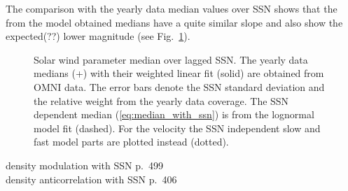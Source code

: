 The comparison with the yearly data median values over SSN shows that the from the model obtained medians have a quite similar slope and also show the expected(??) lower magnitude (see Fig.~\ref{fig:OMNI_yearly_BVNTvsSSN}).\\
\begin{figure}
	\caption{Solar wind parameter median over lagged SSN. The yearly data medians (+) with their weighted linear fit (solid) are obtained from OMNI data. The error bars denote the SSN standard deviation and the relative weight from the yearly data coverage. The SSN dependent median (\ref{eq:median_with_ssn}) is from the lognormal model fit (dashed). For the velocity the SSN independent slow and fast model parts are plotted instead (dotted).}
	\label{fig:OMNI_yearly_BVNTvsSSN}
\end{figure}

density modulation with SSN \citep{Schwenn1983} p.~499\\
density anticorrelation with SSN \citep{Bougeret1984} p.~406\\

